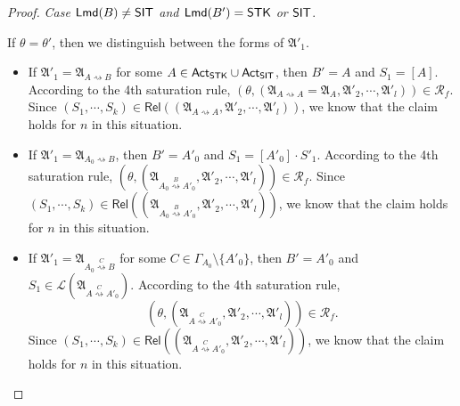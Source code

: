 \documentclass[preprint,12pt]{elsarticle}
\newcommand\act{{\sf Act}}
\newcommand\lmd{{\sf Lmd}}
\newcommand\singletask{{\sf STK}}
\newcommand\singleinstance{{\sf SIT}}
\newcommand\AutReach{\mathscr{R}}
\newcommand\Rel{\mathsf{Rel}}
\newcommand\Aut{{\mathfrak{A} }}
\newcommand\Lang{{\mathscr{L} }}
\begin{document}
\begin{proof}
\noindent \emph{Case $\lmd(B) \neq \singleinstance$ and $\lmd(B') = \singletask$ or $\singleinstance$}. 

If $\theta = \theta'$, then we distinguish between the forms of $\Aut'_1$. 
\begin{itemize}
\item If $\Aut'_1 = \Aut_{A \rightsquigarrow B}$ for some $A \in \act_\singletask \cup \act_\singleinstance$, then $B' = A$ and $S_1 = [A]$. According to the 4th saturation rule, $(\theta, (\Aut_{A \rightsquigarrow A} = \Aut_A, \Aut'_2, \cdots, \Aut'_l)) \in \AutReach_f$. Since $(S_1, \cdots, S_k) \in \Rel((\Aut_{A \rightsquigarrow A}, \Aut'_2, \cdots, \Aut'_l))$, we know that the claim holds for $n$ in this situation.

%
\item If $\Aut'_1 = \Aut_{A_0 \rightsquigarrow B}$, then $B' = A'_0$ and $S_1 = [A'_0] \cdot S'_1$.  According to the 4th saturation rule, $(\theta, (\Aut_{A_0 \stackrel{B}{\rightsquigarrow} A'_0}, \Aut'_2, \cdots, \Aut'_l)) \in \AutReach_f$. Since $(S_1, \cdots, S_k) \in \Rel((\Aut_{A_0 \stackrel{B}{\rightsquigarrow} A'_0}, \Aut'_2, \cdots, \Aut'_l))$, we know that the claim holds for $n$ in this situation.

%
\item If $\Aut'_1 = \Aut_{A_0 \stackrel{C}{\rightsquigarrow} B}$ for some $C \in \Gamma_{A_0} \setminus \{A'_0\}$, then $B' = A'_0$ and $S_1 \in  \Lang(\Aut_{A \stackrel{C}{\rightsquigarrow} A'_0})$.  According to the 4th saturation rule, 
$$(\theta, (\Aut_{A \stackrel{C}{\rightsquigarrow} A'_0}, \Aut'_2, \cdots, \Aut'_l)) \in \AutReach_f.$$ 
Since $(S_1, \cdots, S_k) \in \Rel((\Aut_{A \stackrel{C}{\rightsquigarrow} A'_0}, \Aut'_2, \cdots, \Aut'_l))$, we know that the claim holds for $n$ in this situation.
\end{itemize}


\end{proof}
\end{document}
